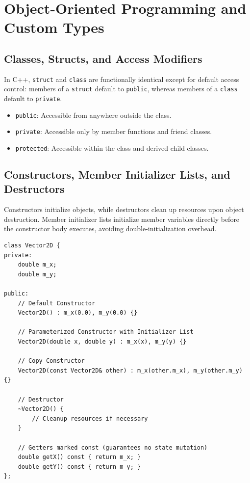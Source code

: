 \documentclass[10pt,journal,compsoc,onecolumn]{IEEEtran}
\begin{document}
\section{Object-Oriented Programming and Custom Types}
\label{sec:oop}

\subsection{Classes, Structs, and Access Modifiers}
In C++, \texttt{struct} and \texttt{class} are functionally identical except for default access control: members of a \texttt{struct} default to \texttt{public}, whereas members of a \texttt{class} default to \texttt{private}.

\begin{itemize}
    \item \texttt{public}: Accessible from anywhere outside the class.
    \item \texttt{private}: Accessible only by member functions and friend classes.
    \item \texttt{protected}: Accessible within the class and derived child classes.
\end{itemize}

\subsection{Constructors, Member Initializer Lists, and Destructors}
Constructors initialize objects, while destructors clean up resources upon object destruction. Member initializer lists initialize member variables directly before the constructor body executes, avoiding double-initialization overhead.

\begin{verbatim}
class Vector2D {
private:
    double m_x;
    double m_y;

public:
    // Default Constructor
    Vector2D() : m_x(0.0), m_y(0.0) {}

    // Parameterized Constructor with Initializer List
    Vector2D(double x, double y) : m_x(x), m_y(y) {}

    // Copy Constructor
    Vector2D(const Vector2D& other) : m_x(other.m_x), m_y(other.m_y) {}

    // Destructor
    ~Vector2D() {
        // Cleanup resources if necessary
    }

    // Getters marked const (guarantees no state mutation)
    double getX() const { return m_x; }
    double getY() const { return m_y; }
};
\end{verbatim}
\end{document}
